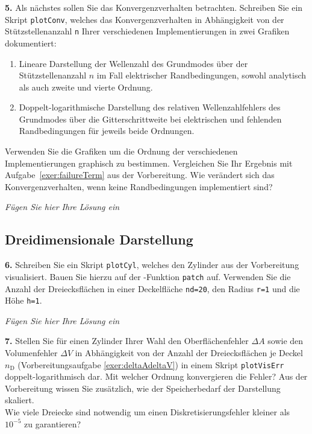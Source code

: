 \documentclass[Protokollheft.tex]{subfiles}
\begin{document}
        \begin{framed}
	\noindent \textbf{5.} Als nächstes sollen Sie das Konvergenzverhalten betrachten. Schreiben Sie ein Skript \lstinline{plotConv}, welches das Konvergenzverhalten in Abhängigkeit von der Stützstellenanzahl \lstinline{n}
                    Ihrer verschiedenen Implementierungen in zwei Grafiken dokumentiert:
                    \begin{enumerate}
                    \item Lineare Darstellung der Wellenzahl des Grundmodes über der Stützstellenanzahl $n$ im Fall elektrischer Randbedingungen, sowohl analytisch als auch zweite und vierte Ordnung.
                    \item Doppelt-logarithmische Darstellung des relativen Wellenzahlfehlers des Grundmodes  über die Gitterschrittweite bei elektrischen und fehlenden Randbedingungen für jeweils beide Ordnungen.
                    \end{enumerate}
                    Verwenden Sie die Grafiken um die Ordnung der verschiedenen Implementierungen graphisch zu bestimmen. Vergleichen Sie Ihr Ergebnis
mit Aufgabe~\ref{exer:failureTerm} aus der Vorbereitung.  Wie verändert sich das Konvergenzverhalten, wenn keine Randbedingungen implementiert sind?\label{exer:plotConv}
\end{framed}

\emph{Fügen Sie hier Ihre Lösung ein}



{\subsection{Dreidimensionale Darstellung}}

        \begin{framed}
	\noindent \textbf{6.} Schreiben Sie ein Skript \lstinline{plotCyl}, welches den Zylinder aus der Vorbereitung visualisiert.
Bauen Sie hierzu auf der \matlab-Funktion \lstinline{patch} auf. Verwenden Sie die Anzahl der Dreiecksflächen
                    in einer Deckelfläche \lstinline{nd=20}, den Radius \lstinline{r=1} und die Höhe \lstinline {h=1}.\label{exer:plotCyl}
\end{framed}

\emph{Fügen Sie hier Ihre Lösung ein}

        \begin{framed}
	\noindent \textbf{7.} Stellen Sie für einen Zylinder Ihrer Wahl den Oberflächenfehler $\Delta A$ sowie den Volumenfehler $\Delta V$ in Abhängigkeit von der Anzahl der Dreiecksflächen je Deckel $n_\text{D}$ (Vorbereitungsaufgabe \ref{exer:deltaAdeltaV}) in einem Skript
                    \lstinline{plotVisErr} doppelt-logarithmisch dar.   Mit welcher Ordnung konvergieren die Fehler?
                    Aus der Vorbereitung wissen Sie zusätzlich, wie der Speicherbedarf der
                    Darstellung skaliert.\\
                    Wie viele Dreiecke sind notwendig um einen Diskretisierungsfehler kleiner als $10^{-5}$ zu garantieren?\label{exer:plotVisErr}
\end{framed}
\end{document}
